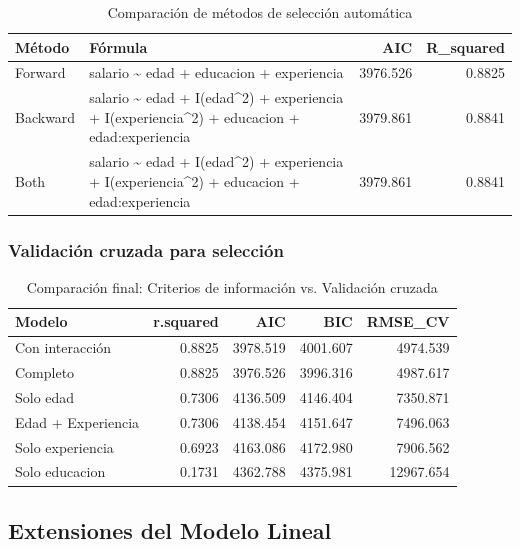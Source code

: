 \documentclass[
  oneside]{book}
\begin{document}
\begin{table}
\centering
\caption{\label{tab:seleccion-automatica}Comparación de métodos de selección automática}
\centering
\begin{tabular}[t]{l|l|r|r}
\hline
Método & Fórmula & AIC & R\_squared\\
\hline
Forward & salario \textasciitilde{} edad + educacion + experiencia & 3976.526 & 0.8825\\
\hline
Backward & salario \textasciitilde{} edad + I(edad\textasciicircum{}2) + experiencia + I(experiencia\textasciicircum{}2) +      educacion + edad:experiencia & 3979.861 & 0.8841\\
\hline
Both & salario \textasciitilde{} edad + I(edad\textasciicircum{}2) + experiencia + I(experiencia\textasciicircum{}2) +      educacion + edad:experiencia & 3979.861 & 0.8841\\
\hline
\end{tabular}
\end{table}

\subsubsection{Validación cruzada para selección}\label{validaciuxf3n-cruzada-para-selecciuxf3n}

\begin{table}
\centering
\caption{\label{tab:validacion-cruzada}Comparación final: Criterios de información vs. Validación cruzada}
\centering
\begin{tabular}[t]{l|r|r|r|r}
\hline
Modelo & r.squared & AIC & BIC & RMSE\_CV\\
\hline
Con interacción & 0.8825 & 3978.519 & 4001.607 & 4974.539\\
\hline
Completo & 0.8825 & 3976.526 & 3996.316 & 4987.617\\
\hline
Solo edad & 0.7306 & 4136.509 & 4146.404 & 7350.871\\
\hline
Edad + Experiencia & 0.7306 & 4138.454 & 4151.647 & 7496.063\\
\hline
Solo experiencia & 0.6923 & 4163.086 & 4172.980 & 7906.562\\
\hline
Solo educacion & 0.1731 & 4362.788 & 4375.981 & 12967.654\\
\hline
\end{tabular}
\end{table}

\subsection{Extensiones del Modelo Lineal}\label{extensiones-del-modelo-lineal}
\end{document}
